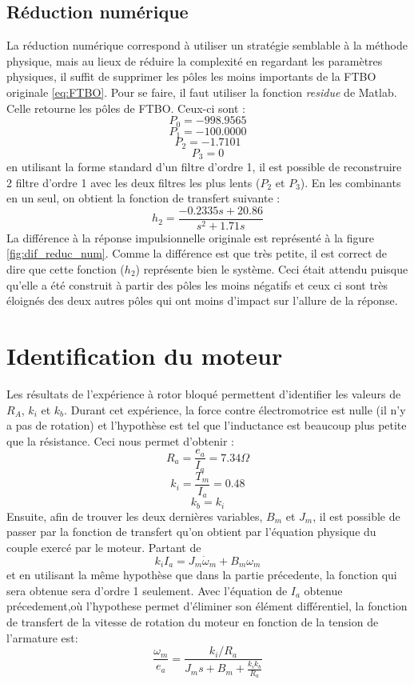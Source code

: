 \documentclass{udes_rapport} %
\begin{document}
\subsection{Réduction numérique}
La réduction numérique correspond à utiliser un stratégie semblable à la méthode physique, mais au lieux de réduire la complexité en regardant les paramètres physiques, il suffit de supprimer les pôles les moins importants de la FTBO originale \eqref{eq:FTBO}. Pour se faire, il faut utiliser la fonction \textit{residue} de Matlab. Celle retourne les pôles de FTBO. Ceux-ci sont :
\[	P_0 = -998.9565	\]
\[	P_1 = -100.0000	\]
\[	P_2 = -1.7101	\]
\[	P_3 = 0	\]
en utilisant la forme standard d'un filtre d'ordre 1, il est possible de reconstruire 2 filtre d'ordre 1 avec les deux filtres les plus lents ($P_2$ et $P_3$). En les combinants en un seul, on obtient la fonction de transfert suivante :
\begin{equation}
h_2 = \frac{-0.2335s + 20.86}{s^2 + 1.71s}
\end{equation}
La différence à la réponse impulsionnelle originale est représenté à la figure \ref{fig:dif_reduc_num}. Comme la différence est que très petite, il est correct de dire que cette fonction ($h_2$) représente bien le système. Ceci était attendu puisque qu'elle a été construit à partir des pôles les moins négatifs et ceux ci sont très éloignés des deux autres pôles qui ont moins d'impact sur l'allure de la réponse.

\section{Identification du moteur}
Les résultats de l'expérience à rotor bloqué permettent d'identifier les valeurs de $R_A$, $k_i$ et $k_b$. Durant cet expérience, la force contre électromotrice est nulle (il n'y a pas de rotation) et l'hypothèse est tel que l'inductance est beaucoup plus petite que la résistance. Ceci nous permet d'obtenir :
\[	R_a = \frac{e_a}{I_a} = 7.34 \Omega	\]
\[	k_i = \frac{T_m}{I_a} =	0.48 		\]
\[	k_b = k_i							\]
Ensuite, afin de trouver les deux dernières variables, $B_m$ et $J_m$, il est possible de passer par la fonction de transfert qu'on obtient par l'équation physique du couple exercé par le moteur. Partant de 
\begin{equation}
k_i I_a = J_m \dot{\omega} _m + B_m \omega _m
\label{eq:torque}
\end{equation}
et en utilisant la même hypothèse que dans la partie précedente, la fonction qui sera obtenue sera d'ordre 1 seulement. Avec l'équation de $I_a$ obtenue précedement,où l'hypothese permet d'éliminer son élément différentiel, la fonction de transfert de la vitesse de rotation du moteur en fonction de la tension de l'armature est:
\begin{equation}
\frac{\omega_m}{e_a} = \frac{k_i/R_a}{J_m s + B_m + \frac{k_i k_b}{R_a}}
\label{eq:tf_moteur}
\end{equation}
\end{document}
